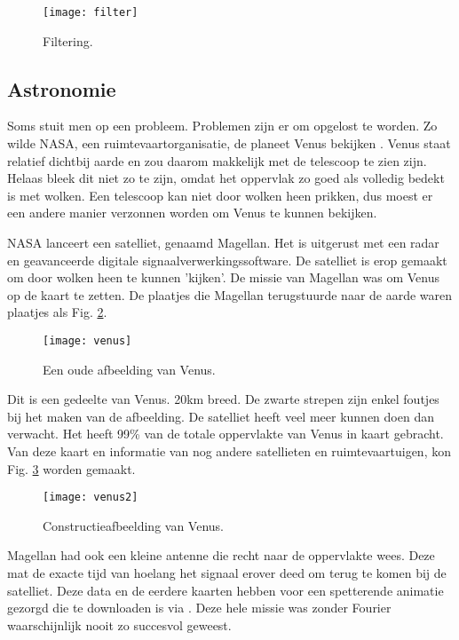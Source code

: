 \documentclass[11pt,fleqn]{book} %
\begin{document}
\begin{figure}[h]
	\centering\texttt{[image: filter]}
	\caption{Filtering.}
	\label{fig:filter}
\end{figure}

\subsection{Astronomie}
Soms stuit men op een probleem. Problemen zijn er om opgelost te worden. Zo wilde NASA, een ruimtevaartorganisatie, de planeet Venus bekijken \cite{jg}. Venus staat relatief dichtbij aarde en zou daarom makkelijk met de telescoop te zien zijn. Helaas bleek dit niet zo te zijn, omdat het oppervlak zo goed als volledig bedekt is met wolken. Een telescoop kan niet door wolken heen prikken, dus moest er een andere manier verzonnen worden om Venus te kunnen bekijken.

NASA lanceert een satelliet, genaamd Magellan. Het is uitgerust met een radar en geavanceerde digitale signaalverwerkingssoftware. De satelliet is erop gemaakt om door wolken heen te kunnen 'kijken'. De missie van Magellan was om Venus op de kaart te zetten. De plaatjes die Magellan terugstuurde naar de aarde waren plaatjes als Fig. \ref{fig:venus}.

\begin{figure}[h]
	\centering\texttt{[image: venus]}
	\caption{Een oude afbeelding van Venus.}
	\label{fig:venus}
\end{figure}

Dit is een gedeelte van Venus. 20km breed. De zwarte strepen zijn enkel foutjes bij het maken van de afbeelding. De satelliet heeft veel meer kunnen doen dan verwacht. Het heeft 99\% van de totale oppervlakte van Venus in kaart gebracht. Van deze kaart en informatie van nog andere satellieten en ruimtevaartuigen, kon Fig. \ref{fig:venus2} worden gemaakt.

\begin{figure}[h]
	\centering\texttt{[image: venus2]}
	\caption{Constructieafbeelding van Venus.}
	\label{fig:venus2}
\end{figure}

Magellan had ook een kleine antenne die recht naar de oppervlakte wees. Deze mat de exacte tijd van hoelang het signaal erover deed om terug te komen bij de satelliet. Deze data en de eerdere kaarten hebben voor een spetterende animatie gezorgd die te downloaden is via \cite{jg}. Deze hele missie was zonder Fourier waarschijnlijk nooit zo succesvol geweest.
\end{document}
